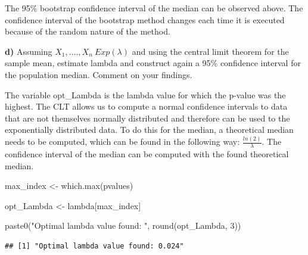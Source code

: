 \documentclass[
]{article}
\newenvironment{Shaded}{\begin{snugshade}}{\end{snugshade}}
\newcommand{\DecValTok}[1]{\textcolor[rgb]{0.00,0.00,0.81}{#1}}
\newcommand{\FunctionTok}[1]{\textcolor[rgb]{0.00,0.00,0.00}{#1}}
\newcommand{\NormalTok}[1]{#1}
\newcommand{\OtherTok}[1]{\textcolor[rgb]{0.56,0.35,0.01}{#1}}
\newcommand{\StringTok}[1]{\textcolor[rgb]{0.31,0.60,0.02}{#1}}
\begin{document}
The 95\% bootstrap confidence interval of the median can be observed
above. The confidence interval of the bootstrap method changes each time
it is executed because of the random nature of the method.

\textbf{d)} Assuming \(X_1,....,X_n ~ Exp(\lambda)\) and using the
central limit theorem for the sample mean, estimate lambda and construct
again a 95\% confidence interval for the population median. Comment on
your findings.

The variable opt\_Lambda is the lambda value for which the p-value was
the highest. The CLT allows us to compute a normal confidence intervals
to data that are not themselves normally distributed and therefore can
be used to the exponentially distributed data. To do this for the
median, a theoretical median needs to be computed, which can be found in
the following way: \(\frac{ln(2)}{\lambda}\). The confidence interval of
the median can be computed with the found theoretical median.

\begin{Shaded}
\begin{Highlighting}[]
\NormalTok{max\_index }\OtherTok{\textless{}{-}} \FunctionTok{which.max}\NormalTok{(pvalues)}

\NormalTok{opt\_Lambda }\OtherTok{\textless{}{-}}\NormalTok{ lambda[max\_index]}

\FunctionTok{paste0}\NormalTok{(}\StringTok{"Optimal lambda value found: "}\NormalTok{, }\FunctionTok{round}\NormalTok{(opt\_Lambda, }\DecValTok{3}\NormalTok{))}
\end{Highlighting}
\end{Shaded}

\begin{verbatim}
## [1] "Optimal lambda value found: 0.024"
\end{verbatim}
\end{document}
